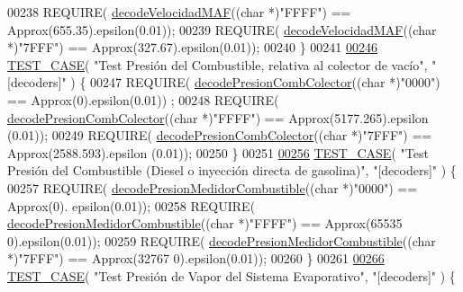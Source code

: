 \begin{DoxyCode}
{{{00238     REQUIRE( \hyperlink{decoders_8cpp_adceefeb78a70b295b378f4c472630aa1}{decodeVelocidadMAF}((\textcolor{keywordtype}{char} *)\textcolor{stringliteral}{"FFFF"}) == Approx(655.35).epsilon(0.01));
00239     REQUIRE( \hyperlink{decoders_8cpp_adceefeb78a70b295b378f4c472630aa1}{decodeVelocidadMAF}((\textcolor{keywordtype}{char} *)\textcolor{stringliteral}{"7FFF"}) == Approx(327.67).epsilon(0.01));
00240 \}
00241 
\hyperlink{UnitTestCase_8cpp_af9cb80dc5e3813608e63479be181d3d7}{00246} \hyperlink{UnitTestCase_8cpp_ab1b7b485076e7de68cd9912827a8ee86}{TEST\_CASE}( \textcolor{stringliteral}{"Test Presión del Combustible, relativa al colector de vacío"}, \textcolor{stringliteral}{"[decoders]"} ) \{
00247     REQUIRE( \hyperlink{decoders_8cpp_a3e32aaf8ced989570e141f01210564f3}{decodePresionCombColector}((\textcolor{keywordtype}{char} *)\textcolor{stringliteral}{"0000"}) == Approx(0).epsilon(0.01))
      ;
00248     REQUIRE( \hyperlink{decoders_8cpp_a3e32aaf8ced989570e141f01210564f3}{decodePresionCombColector}((\textcolor{keywordtype}{char} *)\textcolor{stringliteral}{"FFFF"}) == Approx(5177.265).epsilon
      (0.01));
00249     REQUIRE( \hyperlink{decoders_8cpp_a3e32aaf8ced989570e141f01210564f3}{decodePresionCombColector}((\textcolor{keywordtype}{char} *)\textcolor{stringliteral}{"7FFF"}) == Approx(2588.593).epsilon
      (0.01));
00250 \}
00251 
\hyperlink{UnitTestCase_8cpp_a578a25cbf0eb039b82b3f9c2c9934672}{00256} \hyperlink{UnitTestCase_8cpp_ab1b7b485076e7de68cd9912827a8ee86}{TEST\_CASE}( \textcolor{stringliteral}{"Test Presión del Combustible (Diesel o inyección directa de gasolina)"}, \textcolor{stringliteral}{"[decoders]"} )
       \{
00257     REQUIRE( \hyperlink{decoders_8cpp_a228605d8cad0901a691ba4155a2326fc}{decodePresionMedidorCombustible}((\textcolor{keywordtype}{char} *)\textcolor{stringliteral}{"0000"}) == Approx(0).
      epsilon(0.01));
00258     REQUIRE( \hyperlink{decoders_8cpp_a228605d8cad0901a691ba4155a2326fc}{decodePresionMedidorCombustible}((\textcolor{keywordtype}{char} *)\textcolor{stringliteral}{"FFFF"}) == Approx(65535
      0).epsilon(0.01));
00259     REQUIRE( \hyperlink{decoders_8cpp_a228605d8cad0901a691ba4155a2326fc}{decodePresionMedidorCombustible}((\textcolor{keywordtype}{char} *)\textcolor{stringliteral}{"7FFF"}) == Approx(32767
      0).epsilon(0.01));
00260 \}
00261 
\hyperlink{UnitTestCase_8cpp_a0a88bc70e4d8ddcd9617e864ec5a4f05}{00266} \hyperlink{UnitTestCase_8cpp_ab1b7b485076e7de68cd9912827a8ee86}{TEST\_CASE}( \textcolor{stringliteral}{"Test Presión de Vapor del Sistema Evaporativo"}, \textcolor{stringliteral}{"[decoders]"} ) \{
}}}
\end{DoxyCode}
